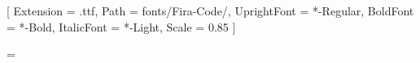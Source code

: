 %


\usepackage{amsmath}
\usepackage{amssymb}
\usepackage{amsthm}
\usepackage{thmtools}
\usepackage{mathtools}
\usepackage{thm-restate}
\usepackage{dsfont}        %
\usepackage{braceMnSymbol} %


\usepackage
[
    mono=false, %
]
{libertinus-otf} %

\usepackage{fontspec}  %
\setmonofont{FiraCode} %
[
	Extension = .ttf,
	Path = fonts/Fira-Code/,
	UprightFont = *-Regular,
	BoldFont = *-Bold,
	ItalicFont = *-Light,
	Scale = 0.85
]

\usepackage{url} %
\usepackage{bm}  %


\usepackage{graphicx} %
\usepackage
[
    subrefformat = simple, %
    labelformat = simple,  %
]
{subcaption}         %
\usepackage{wrapfig} %

\columnsep = \mymargininnersep
\renewcommand*{\thesubfigure}{~(\alph{subfigure})}

